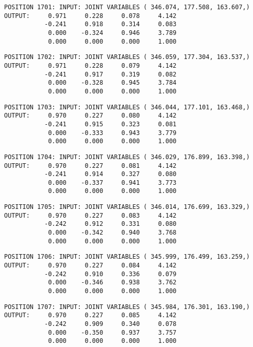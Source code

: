 \begin{verbatim}
POSITION 1701: INPUT: JOINT VARIABLES ( 346.074, 177.508, 163.607,)
OUTPUT:     0.971     0.228     0.078     4.142
           -0.241     0.918     0.314     0.083
            0.000    -0.324     0.946     3.789
            0.000     0.000     0.000     1.000
\end{verbatim} \pagebreak[1]\begin{verbatim}
POSITION 1702: INPUT: JOINT VARIABLES ( 346.059, 177.304, 163.537,)
OUTPUT:     0.971     0.228     0.079     4.142
           -0.241     0.917     0.319     0.082
            0.000    -0.328     0.945     3.784
            0.000     0.000     0.000     1.000
\end{verbatim} \pagebreak[1]\begin{verbatim}
POSITION 1703: INPUT: JOINT VARIABLES ( 346.044, 177.101, 163.468,)
OUTPUT:     0.970     0.227     0.080     4.142
           -0.241     0.915     0.323     0.081
            0.000    -0.333     0.943     3.779
            0.000     0.000     0.000     1.000
\end{verbatim} \pagebreak[1]\begin{verbatim}
POSITION 1704: INPUT: JOINT VARIABLES ( 346.029, 176.899, 163.398,)
OUTPUT:     0.970     0.227     0.081     4.142
           -0.241     0.914     0.327     0.080
            0.000    -0.337     0.941     3.773
            0.000     0.000     0.000     1.000
\end{verbatim} \pagebreak[1]\begin{verbatim}
POSITION 1705: INPUT: JOINT VARIABLES ( 346.014, 176.699, 163.329,)
OUTPUT:     0.970     0.227     0.083     4.142
           -0.242     0.912     0.331     0.080
            0.000    -0.342     0.940     3.768
            0.000     0.000     0.000     1.000
\end{verbatim} \pagebreak[1]\begin{verbatim}
POSITION 1706: INPUT: JOINT VARIABLES ( 345.999, 176.499, 163.259,)
OUTPUT:     0.970     0.227     0.084     4.142
           -0.242     0.910     0.336     0.079
            0.000    -0.346     0.938     3.762
            0.000     0.000     0.000     1.000
\end{verbatim} \pagebreak[1]\begin{verbatim}
POSITION 1707: INPUT: JOINT VARIABLES ( 345.984, 176.301, 163.190,)
OUTPUT:     0.970     0.227     0.085     4.142
           -0.242     0.909     0.340     0.078
            0.000    -0.350     0.937     3.757
            0.000     0.000     0.000     1.000
\end{verbatim} \pagebreak[1]\begin{verbatim}

\end{verbatim}
